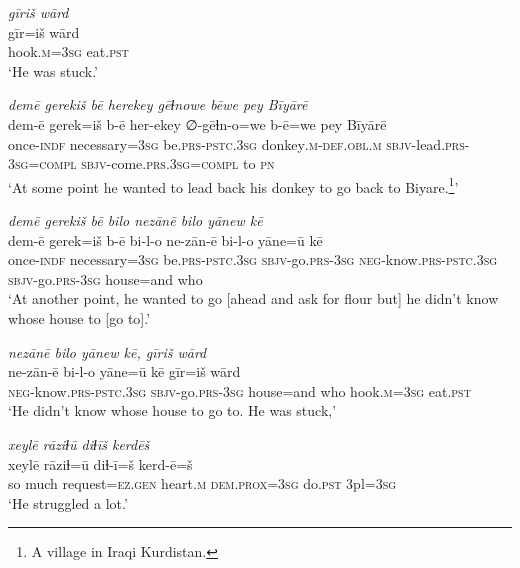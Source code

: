 \ea \label{HB.24}
\textit{gīriš wārd} \\ 
\gll gīr=iš wārd \\ 
 hook\textsc{.m}\textsc{=3sg} eat\textsc{.pst} \\ 
\glt `He was stuck.'
\z 
 
\ea \label{HB.25}
\textit{demē gerekiš bē herekey gēɫnowe bēwe pey Bīyārē} \\ 
\gll dem-ē gerek=iš b-ē her-ekey ∅-gēɫn-o=we b-ē=we pey Bīyārē \\ 
 once\textsc{-indf} necessary\textsc{=3sg} be\textsc{.prs}\textsc{-pstc}\textsc{.3sg} donkey\textsc{.m}\textsc{-def}\textsc{.obl}\textsc{.m} \textsc{sbjv-}lead\textsc{.prs}\textsc{-3sg}\textsc{=\textsc{compl}} \textsc{sbjv-}come\textsc{.prs}\textsc{.3sg}\textsc{=\textsc{compl}} to \textsc{pn} \\ 
\glt `At some point he wanted to lead back his donkey to go back to Biyare.\footnote{A village in Iraqi Kurdistan.}'
\z 
 
\ea \label{HB.26}
\textit{demē gerekiš bē bilo nezānē bilo yānew kē} \\ 
\gll dem-ē gerek=iš b-ē bi-l-o ne-zān-ē bi-l-o yāne=ū kē \\ 
 once\textsc{-indf} necessary\textsc{=3sg} be\textsc{.prs}\textsc{-pstc}\textsc{.3sg} \textsc{sbjv-}go\textsc{.prs}\textsc{-3sg} \textsc{neg-}know\textsc{.prs}\textsc{-pstc}\textsc{.3sg} \textsc{sbjv-}go\textsc{.prs}\textsc{-3sg} house=and who \\ 
\glt `At another point, he wanted to go [ahead and ask for flour but] he didn’t know whose house to [go to].'
\z 
 
\ea \label{HB.27}
\textit{nezānē bilo yānew kē, gīriš wārd} \\ 
\gll ne-zān-ē bi-l-o yāne=ū kē gīr=iš wārd \\ 
 \textsc{neg-}know\textsc{.prs}\textsc{-pstc}\textsc{.3sg} \textsc{sbjv-}go\textsc{.prs}\textsc{-3sg} house=and who hook\textsc{.m}\textsc{=3sg} eat\textsc{.pst} \\ 
\glt `He didn’t know whose house to go to. He was stuck,'
\z 
 
\ea \label{HB.28}
\textit{xeylē rāziɫū diɫīš kerdēš} \\ 
\gll xeylē rāziɫ=ū diɫ-ī=š kerd-ē=š \\ 
 so much request\textsc{=ez}\textsc{.gen} heart\textsc{.m} \textsc{dem.prox}\textsc{=3sg} do\textsc{.pst} 3pl\textsc{=3sg} \\ 
\glt `He struggled a lot.'
\z 
 
